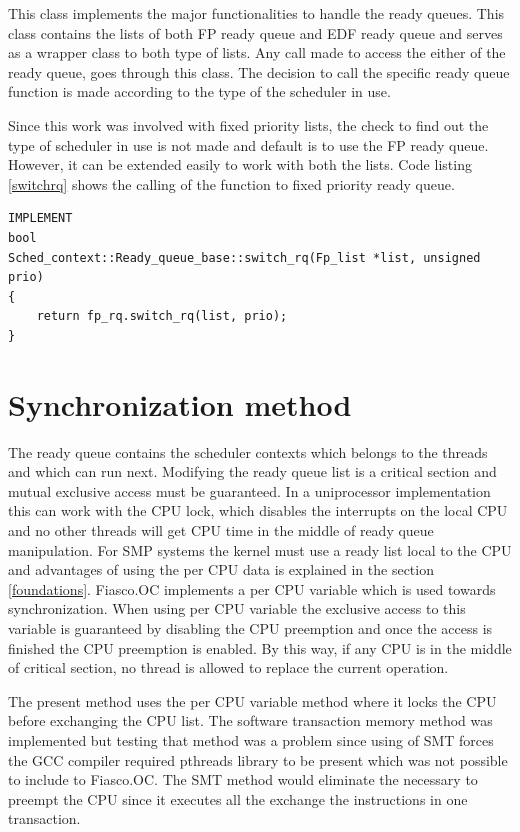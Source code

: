 This class implements the major functionalities to handle the ready queues. This class contains the lists of both FP ready queue and EDF ready queue and serves as a wrapper class to both type of lists. Any call made to access the either of the ready queue, goes through this class. The decision to call the specific ready queue function is made according to the type of the scheduler in use.

Since this work was involved with fixed priority lists, the check to find out the type of scheduler in use is not made and default is to use the FP ready queue. However, it can be extended easily to work with both the lists. Code listing \ref{switchrq} shows the calling of the function to fixed priority ready queue.

\begin{lstlisting}[caption={Exchanging the ready queue},label=switchrq, style=customcpp]
IMPLEMENT
bool
Sched_context::Ready_queue_base::switch_rq(Fp_list *list, unsigned prio)
{
	return fp_rq.switch_rq(list, prio);
}
\end{lstlisting}

\section{Synchronization method}\label{imp:sync}

The ready queue contains the scheduler contexts which belongs to the threads and which can run next. Modifying the ready queue list is a critical section and mutual exclusive access must be guaranteed. In a uniprocessor implementation this can work with the CPU lock, which disables the interrupts on the local CPU and no other threads will get CPU time in the middle of ready queue manipulation. For SMP systems the kernel must use a ready list local to the CPU and advantages of using the per CPU data is explained in the section \ref{foundations}. Fiasco.OC implements a per CPU variable which is used towards synchronization. When using per CPU variable the exclusive access to this variable is guaranteed by disabling the CPU preemption and once the access is finished the CPU preemption is enabled. By this way, if any CPU is in the middle of critical section, no thread is allowed to replace the current operation. 

The present method uses the per CPU variable method where it locks the CPU before exchanging the CPU list. The software transaction memory method was implemented but testing that method was a problem since using of SMT forces the GCC compiler required pthreads library to be present which was not possible to include to Fiasco.OC. The SMT method would eliminate the necessary to preempt the CPU since it executes all the exchange the instructions in one transaction.

